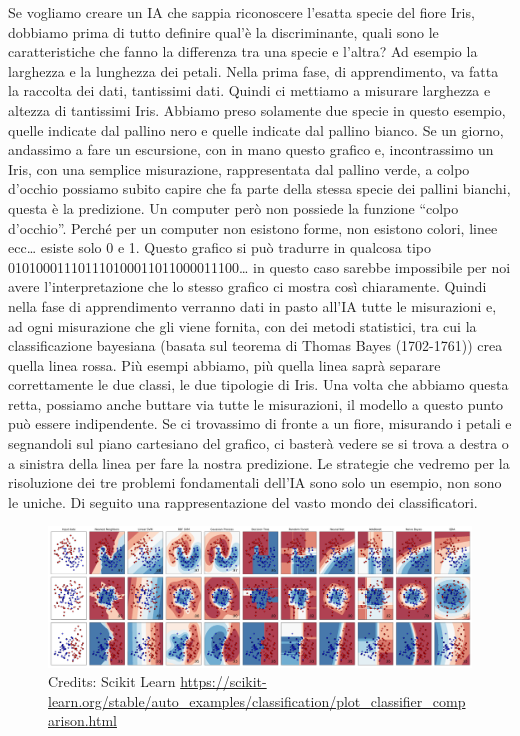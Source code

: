 \documentclass[12pt]{book} %
\begin{document}
Se vogliamo creare un IA che sappia riconoscere l'esatta specie del fiore Iris, dobbiamo prima di
tutto definire qual'è la discriminante, quali sono le caratteristiche che fanno la differenza tra
una specie e l'altra? Ad esempio la larghezza e la lunghezza dei petali. Nella prima fase, di
apprendimento, va fatta la raccolta dei dati, tantissimi dati. Quindi ci mettiamo a misurare larghezza e altezza di
tantissimi Iris. Abbiamo preso solamente due specie in questo esempio, quelle indicate dal pallino nero e quelle
indicate dal pallino bianco. Se un giorno, andassimo a fare un escursione, con in mano questo grafico e, incontrassimo
un Iris, con una semplice misurazione, rappresentata dal pallino verde, a colpo d'occhio possiamo
subito capire che fa parte della stessa specie dei pallini bianchi, questa è la predizione. Un computer però non
possiede la funzione “colpo d'occhio”. Perché per un computer non esistono forme, non esistono
colori, linee ecc… esiste solo 0 e 1. Questo grafico si può tradurre in qualcosa tipo
010100011101110100011011000011100… in questo caso sarebbe impossibile per noi avere
l'interpretazione che lo stesso grafico ci mostra così chiaramente. Quindi nella fase di
apprendimento verranno dati in pasto all'IA tutte le misurazioni e, ad ogni misurazione che gli
viene fornita, con dei metodi statistici, tra cui la classificazione bayesiana (basata sul teorema di Thomas Bayes
(1702-1761)) crea quella linea rossa. Più esempi abbiamo, più quella linea saprà separare correttamente le due classi,
le due tipologie di Iris. Una volta che abbiamo questa retta, possiamo anche buttare via tutte le misurazioni, il
modello a questo punto può essere indipendente. Se ci trovassimo di fronte a un fiore, misurando i petali e segnandoli
sul piano cartesiano del grafico, ci basterà vedere se si trova a destra o a sinistra della linea per fare la nostra
predizione. Le strategie che vedremo per la risoluzione dei tre problemi fondamentali dell'IA sono
solo un esempio, non sono le uniche. Di seguito una rappresentazione del vasto mondo dei classificatori.

\begin{figure}[H]
  \begin{minipage}{17cm}
    \includegraphics[width=17cm]{images/Libro-img046.png}
    \caption{Credits: Scikit Learn \protect\url{https://scikit-learn.org/stable/auto\_examples/classification/plot\_classifier\_comparison.html} }
  \end{minipage}
\end{figure}
\end{document}

